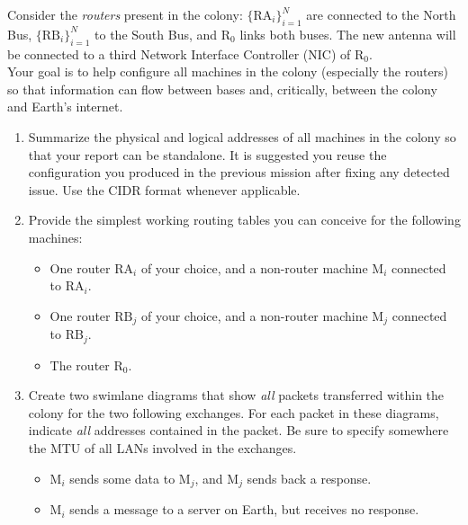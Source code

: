 \noindent
Consider the \textit{routers} present in the colony: $\{\textrm{RA}_i\}_{i=1}^{N}$ are connected to the North Bus, $\{\textrm{RB}_i\}_{i=1}^{N}$ to the South Bus, and $\textrm{R}_0$ links both buses. The new antenna will be connected to a third Network Interface Controller (NIC) of $\textrm{R}_0$.\\

\noindent
Your goal is to help configure all machines in the colony (especially the routers) so that information can flow between bases and, critically, between the colony and Earth's internet.
\vspace{-0.2cm}

\begin{enumerate}[itemsep=0.1cm]
\item Summarize the physical and logical addresses of all machines in the colony so that your report can be standalone. It is suggested you reuse the configuration you produced in the previous mission after fixing any detected issue. Use the CIDR format whenever applicable.

\item Provide the simplest working routing tables you can conceive for the following machines:
\begin{itemize}
\item One router $\textrm{RA}_i$ of your choice,
and a non-router machine $\textrm{M}_i$ connected to $\textrm{RA}_i$.
\item One router $\textrm{RB}_j$ of your choice,
and a non-router machine $\textrm{M}_j$ connected to $\textrm{RB}_j$.
\item The router $\textrm{R}_0$.
\end{itemize}

\item Create two swimlane diagrams that show \textit{all} packets transferred within the colony for the two following exchanges. For each packet in these diagrams, indicate \textit{all} addresses contained in the packet. Be sure to specify somewhere the MTU of all LANs involved in the exchanges.
\begin{itemize}
\item $\textrm{M}_i$ sends some data to $\textrm{M}_j$, and $\textrm{M}_j$ sends back a response.
\item $\textrm{M}_i$ sends a message to a server on Earth, but receives no response.
\end{itemize}
\end{enumerate}

